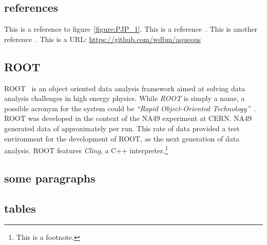 \subsection{references}

This is a reference to figure~\ref{figure:PJP_1}. This is a reference~\cite{Tianjun_1}. This is another reference~\cite{McCulloch_Pitts_1}. This is a URL: \href{https://github.com/wdbm/aqueous}{\textcolor{black!100}{https://github.com/wdbm/aqueous}}


\subsection{ROOT}

ROOT~\cite{ROOT} is an object oriented data analysis framework aimed at solving data analysis challenges in high energy physics. While \emph{ROOT} is simply a name, a possible acronym for the system could be \emph{``Rapid Object-Oriented Technology''}~\cite{ROOT_acronym}. ROOT was developed in the context of the NA49 experiment at CERN. NA49 generated data of approximately  per run. This rate of data provided a test environment for the development of ROOT, as the next generation of data analysis. ROOT features \emph{Cling}, a C++ interpreter.\footnote{This is a footnote.}

\newpage

\subsection{some paragraphs}

\lipsum[1-4]

\newpage

\subsection{tables}


